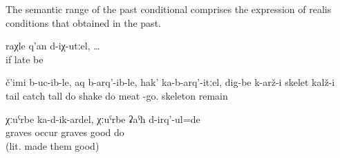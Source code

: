 The semantic range of the past conditional comprises the expression of realis conditions that obtained in the past.
%
\begin{exe}
	\ex	\label{ex:If we were too late}
	\gll	raχle	q'an	d-iχ-utːel, \ldots\\
		if	late	be\\
	\glt	{}

	\ex	\label{ex:If you hold the tail (of the fish) and lift it up and shake it}
	\gll	č'imi	b-uc-ib-le,	aq	b-arq'-ib-le,	hak'	ka-b-arq'-itːel,	dig-be	k-arž-i	skelet	kalž-i\\
		tail	catch	tall	do shake	do	meat	-go.	skeleton	remain\\
	\glt	{}

	\ex	\label{ex:When/if graves fell down, (grandfather) put them up again}
	\gll	χːuˁrbe	ka-d-ik-ardel, 	χːuˁrbe	ʡaˁħ	d-irq'-ul=de\\
		graves	occur graves	good	do\\
	\glt	{} (lit. made them good)
\end{exe}

